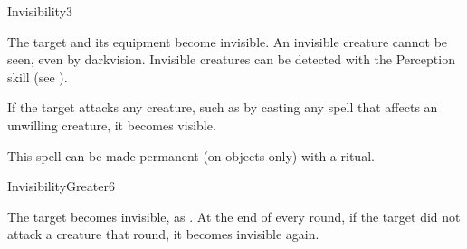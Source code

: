 \begin{spellsection}{Invisibility}{3}
\begin{spellheader}
\end{spellheader}
\begin{spellcontent}
    \begin{spelltargetinginfo}
    \end{spelltargetinginfo}
    \begin{spelleffects}
        \spelleffect The target and its equipment become invisible. An invisible creature cannot be seen, even by darkvision. Invisible creatures can be detected with the Perception skill (see ).

        If the target attacks any creature, such as by casting any spell that affects an unwilling creature, it becomes visible.
        \spelldur \durshort \dismissable
    \end{spelleffects}
\end{spellcontent}
\begin{spellfooter}
    \spellnotes This spell can be made permanent (on objects only) with a  ritual.
\end{spellfooter}
\end{spellsection}

\begin{spellsection}{Invisibility}{Greater}{6}
\begin{spellheader}
\end{spellheader}
\begin{spellcontent}
    \begin{spelltargetinginfo}
    \end{spelltargetinginfo}
    \begin{spelleffects}
        \spelleffect The target becomes invisible, as . At the end of every round, if the target did not attack a creature that round, it becomes invisible again.
        \spelldur \durshort \dismissable
    \end{spelleffects}
\end{spellcontent}
\begin{spellfooter}
\end{spellfooter}
\end{spellsection}

